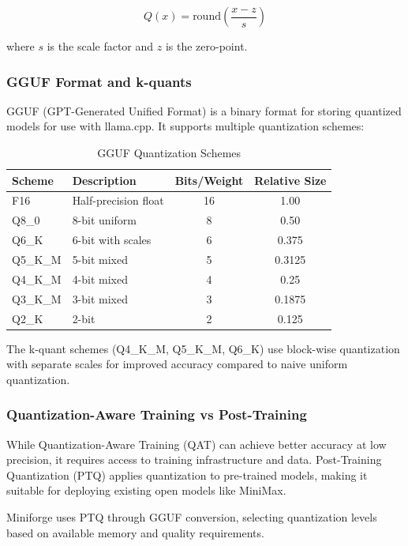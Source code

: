 \begin{equation}
Q(x) = \text{round}\left(\frac{x - z}{s}\right)
\end{equation}

where $s$ is the scale factor and $z$ is the zero-point.

\subsubsection{GGUF Format and k-quants}

GGUF (GPT-Generated Unified Format) \cite{ggerganov2023gguf} is a binary format for storing quantized models for use with llama.cpp. It supports multiple quantization schemes:

\begin{table}[h]
\centering
\caption{GGUF Quantization Schemes}
\label{tab:quantization_schemes}
\begin{tabular}{llcc}
\toprule
\textbf{Scheme} & \textbf{Description} & \textbf{Bits/Weight} & \textbf{Relative Size} \\
\midrule
F16 & Half-precision float & 16 & 1.00 \\
Q8\_0 & 8-bit uniform & 8 & 0.50 \\
Q6\_K & 6-bit with scales & 6 & 0.375 \\
Q5\_K\_M & 5-bit mixed & 5 & 0.3125 \\
Q4\_K\_M & 4-bit mixed & 4 & 0.25 \\
Q3\_K\_M & 3-bit mixed & 3 & 0.1875 \\
Q2\_K & 2-bit & 2 & 0.125 \\
\bottomrule
\end{tabular}
\end{table}

The k-quant schemes (Q4\_K\_M, Q5\_K\_M, Q6\_K) use block-wise quantization with separate scales for improved accuracy compared to naive uniform quantization.

\subsubsection{Quantization-Aware Training vs Post-Training}

While Quantization-Aware Training (QAT) can achieve better accuracy at low precision, it requires access to training infrastructure and data. Post-Training Quantization (PTQ) applies quantization to pre-trained models, making it suitable for deploying existing open models like MiniMax.

Miniforge uses PTQ through GGUF conversion, selecting quantization levels based on available memory and quality requirements.

